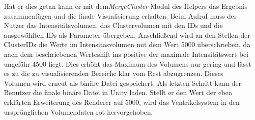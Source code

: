 Hat er dies getan kann er mit dem\textit{MergeCluster} Modul des Helpers das Ergebnis zusammenfügen und die finale Visualisierung erhalten. Beim Aufruf muss der Nutzer das Intensitätsvolumen, das Clustervolumen mit den IDs und die ausgewählten IDs als Parameter übergeben. Anschließend wird an den Stellen der ClusterIDs die Werte im Intensitäsvolumen mit dem Wert 5000 überschrieben, da nach dem beschriebenen Werteshift ins positive der maximale Intensitätswert bei ungefähr 4500 liegt. Dies erhöht das Maximum des Volumens nur gering und lässt es zu die zu visualisierenden Bereiche klar vom Rest abzugrenzen. Dieses Volumen wird erneut als binäre Datei gespeichert.
\newline
Als letzten Schritt kann der Benutzer die finale binäre Datei in Unity laden. Stellt er den Wert der eben erklärten Erweiterung des Renderer auf 5000, wird das Ventrikelsystem in den ursprünglichen Volumendaten rot hervorgehoben.













































